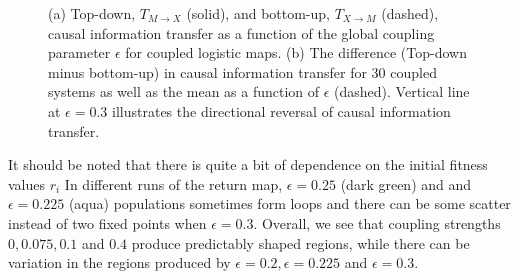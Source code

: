 \documentclass[conference]{IEEEtran}
\begin{document}
\begin{figure}[!t]
\centering
{}
\hfill
{}
\caption{(a) Top-down, $T_{M\rightarrow X}$ (solid), and bottom-up, $T_{X\rightarrow M}$ (dashed), causal information transfer as a function of the global coupling parameter $\epsilon$ for coupled logistic maps. (b) The difference (Top-down minus bottom-up) in causal information transfer for $30$ coupled systems as well as the mean as a function of $\epsilon$ (dashed). Vertical line at $\epsilon = 0.3$ illustrates the directional reversal of causal information transfer.}
\label{te_avg}
\end{figure}

It should be noted that there is quite a bit of dependence on the initial fitness values $r_i$   In different runs of the return map, $\epsilon = 0.25$ (dark green) and and $\epsilon = 0.225$ (aqua) populations sometimes form loops and there can be some scatter instead of two fixed points when $\epsilon = 0.3$.  Overall, we see that coupling strengths $0, 0.075, 0.1$ and $0.4$ produce predictably shaped regions, while there can be variation in the regions produced by $\epsilon = 0.2,  \epsilon = 0.225$ and $\epsilon = 0.3$. 

\end{document}
